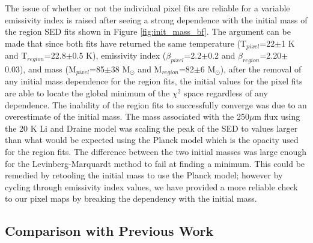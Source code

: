 The issue of whether or not the individual pixel fits are reliable for a variable emissivity index is raised after seeing a strong dependence with the initial mass of the region SED fits shown in Figure \ref{fig:init_mass_bf}.  The argument can be made that since both fits have returned the same temperature (T$_{pixel}$=22$\pm$1 K and T$_{region}$=22.8$\pm$0.5 K), emissivity index ($\beta_{pixel}$=2.2$\pm$0.2 and $\beta_{region}$=2.20$\pm$0.03), and mass (M$_{pixel}$=85$\pm$38 M$_\odot$ and M$_{region}$=82$\pm$6 M$_\odot$), after the removal of any initial mass dependence for the region fits, the initial values for the pixel fits are able to locate the global minimum of the $\chi^2$ space regardless of any dependence.  The inability of the region fits to successfully converge was due to an overestimate of the initial mass.  The mass associated with the 250$\mu$m flux using the 20 K Li and Draine model was scaling the peak of the SED to values larger than what would be expected using the Planck model which is the opacity used for the region fits.  The difference between the two initial masses was large enough for the Levinberg-Marquardt method to fail at finding a minimum.  This could be remedied by retooling the initial mass to use the Planck model; however by cycling through emissivity index values, we have provided a more reliable check to our pixel maps by breaking the dependency with the initial mass.

\subsection{Comparison with Previous Work}

